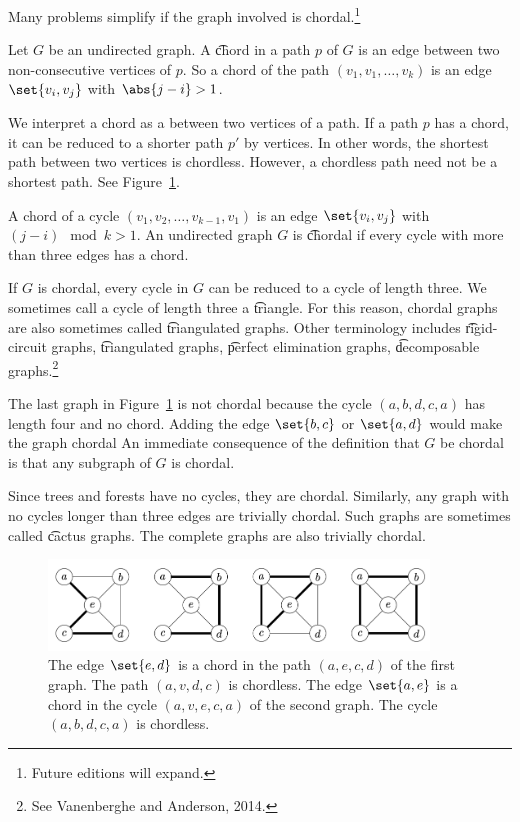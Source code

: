 

Many problems simplify if the graph involved is chordal.\footnote{Future editions will expand.}


Let $G$ be an undirected graph.
A \t{chord} in a path $p$ of $G$ is an edge between two non-consecutive vertices of $p$.
So a chord of the path $(v_1, v_1, \dots, v_{k})$ is an edge $\set{v_i, v_j}$ with $\abs{j - i} > 1$.

We interpret a chord as a  between two vertices of a path.
If a path $p$ has a chord, it can be reduced to a shorter path $p'$ by  vertices.
In other words, the shortest path between two vertices is chordless.
However, a chordless path need not be a shortest path.
See Figure~\ref{figure:chordal_graphs:chords}.


A chord of a cycle $(v_1, v_2, \dots, v_{k-1}, v_1)$ is an edge $\set{v_i, v_j}$ with $(j - i) \mod k > 1$.
An undirected graph $G$ is \t{chordal} if every cycle with more than three edges has a chord.

If $G$ is chordal, every cycle in $G$ can be reduced to a cycle of length three.
We sometimes call a cycle of length three a \t{triangle}.
For this reason, chordal graphs are also sometimes called \t{triangulated graphs}.
Other terminology includes \t{rigid-circuit graphs}, \t{triangulated graphs}, \t{perfect elimination graphs}, \t{decomposable graphs}.\footnote{See Vanenberghe and Anderson, 2014.}

The last graph in Figure~\ref{figure:chordal_graphs:chords} is not chordal because the cycle $(a, b, d, c, a)$ has length four and no chord.
Adding the edge $\set{b, c}$ or $\set{a, d}$ would make the graph chordal
An immediate consequence of the definition that $G$ be chordal is that any subgraph of $G$ is chordal.



Since trees and forests have no cycles, they are chordal.
Similarly, any graph with no cycles longer than three edges are trivially chordal.
Such graphs are sometimes called \t{cactus graphs}.
The complete graphs are also trivially chordal.

\begin{figure}
  \centering
  \includegraphics[width=0.9\textwidth]{graphics_included/chords}
  \caption{
  The edge $\set{e, d}$ is a chord in the path $(a, e, c, d)$ of the first graph. The path $(a, v, d, c)$ is chordless.
  The edge $\set{a, e}$ is a chord in the cycle $(a, v, e, c, a)$ of the second graph.
  The cycle $(a, b, d, c, a)$ is chordless.
  }
  \label{figure:chordal_graphs:chords}
\end{figure}
